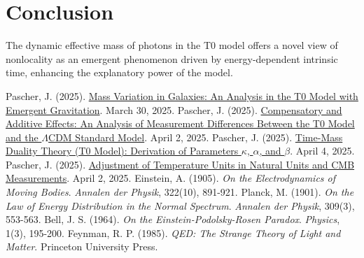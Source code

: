 \documentclass[12pt,a4paper]{article}
\begin{document}
	\section{Conclusion}
	The dynamic effective mass of photons in the T0 model offers a novel view of nonlocality as an emergent phenomenon driven by energy-dependent intrinsic time, enhancing the explanatory power of the model.
	
	\begin{thebibliography}{99}
		 Pascher, J. (2025). \href{https://github.com/jpascher/T0-Time-Mass-Duality/tree/main/2/pdf/English/MassVarGalaxienEn.pdf}{Mass Variation in Galaxies: An Analysis in the T0 Model with Emergent Gravitation}. March 30, 2025.
		 Pascher, J. (2025). \href{https://github.com/jpascher/T0-Time-Mass-Duality/tree/main/2/pdf/English/MessdifferenzenT0StandardEn.pdf}{Compensatory and Additive Effects: An Analysis of Measurement Differences Between the T0 Model and the \(\Lambda\)CDM Standard Model}. April 2, 2025.
		 Pascher, J. (2025). \href{https://github.com/jpascher/T0-Time-Mass-Duality/tree/main/2/pdf/English/ZeitMasseT0ParamsEn.pdf}{Time-Mass Duality Theory (T0 Model): Derivation of Parameters \(\kappa\), \(\alpha\), and \(\beta\)}. April 4, 2025.
		 Pascher, J. (2025). \href{https://github.com/jpascher/T0-Time-Mass-Duality/tree/main/2/pdf/English/NatEinheitenAlpha1En.pdf}{Adjustment of Temperature Units in Natural Units and CMB Measurements}. April 2, 2025.
		 Einstein, A. (1905). \textit{On the Electrodynamics of Moving Bodies}. \textit{Annalen der Physik}, 322(10), 891-921.
		 Planck, M. (1901). \textit{On the Law of Energy Distribution in the Normal Spectrum}. \textit{Annalen der Physik}, 309(3), 553-563.
		 Bell, J. S. (1964). \textit{On the Einstein-Podolsky-Rosen Paradox}. \textit{Physics}, 1(3), 195-200.
		 Feynman, R. P. (1985). \textit{QED: The Strange Theory of Light and Matter}. Princeton University Press.
	\end{thebibliography}
	
\end{document}
